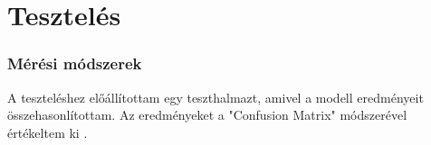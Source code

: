\chapter {Tesztelés}
\label{ch:testing}

\subsection {Mérési módszerek}

A teszteléshez előállítottam egy teszthalmazt, amivel a modell eredményeit összehasonlítottam. Az eredményeket a "Confusion Matrix" módszerével értékeltem ki \cite{CONGALTON199135}.